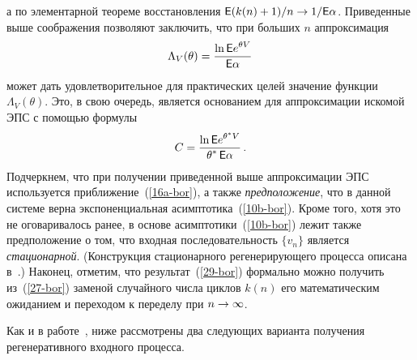 \begin{multicols}{2}
\begin{equation*}
\end{equation*}
а по элементарной теореме восстановления $\e (k(n)\hm+1)/n\hm\to
1/\e\alpha$.  Приведенные выше  соображения позволяют заключить, что
при больших $n$ аппроксимация
\begin{equation}
\Lambda_V(\theta)= \displaystyle\frac{\displaystyle \ln {\sf E} e^{\theta V}\mathstrut}{\displaystyle {\sf E} \alpha\mathstrut}
  \label{29-bor}
\end{equation}
может дать   удовлетворительное  для практических целей значение
функции $\Lambda_V(\theta)$. Это, в свою очередь, является
основанием для аппроксимации искомой ЭПС с помощью формулы
\begin{equation}
C= \displaystyle\frac{\displaystyle \ln {\sf E} e^{\theta^* V}\mathstrut}{\displaystyle \theta^*\,{\sf E} \alpha\mathstrut}\,.
  \label{30-bor}
\end{equation}
Подчеркнем, что при получении приведенной выше аппроксимации ЭПС
используется  приближение~(\ref{16a-bor}), а также {\it предположение},
что в данной сис\-те\-ме верна экспоненциальная асимптотика~(\ref{10b-bor}).\linebreak
Кроме того, хотя это не оговаривалось ранее, в основе асимптотики~(\ref{10b-bor}) 
лежит также предположение о том, что входная
последовательность $\{v_n\}$ является {\it стационарной}.
(Конструкция стационарного регенерирующего процесса описана  в~\cite{Thorrison1}.)    
Наконец, отметим, что результат~(\ref{29-bor})
формально можно  получить из~(\ref{27-bor})
 заменой случайного чис\-ла цик\-лов  $k(n)$ его  математическим
ожиданием и переходом к переделу при $n\hm\to \infty$.

 Как и в работе~\cite{KRC}, ниже рассмотрены
 два следующих варианта получения  регенеративного
входного процесса.


\end{multicols}
